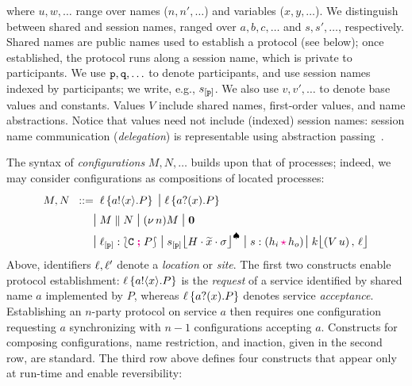 \documentclass[runningheads,plain]{llncs}
\begin{document}
\noindent 
where  
$u, w, \ldots$
range over 
names ($n, n', \ldots$) and variables ($x,y,\ldots$).
We distinguish between shared and session names, 
ranged over
$a,b,c,\ldots$ and $s,s',\ldots$, respectively.
Shared names are public names used to establish a protocol (see below); once established, the protocol runs along a session name, which is private to participants.
We   use $\mathtt{p}, \mathtt{q}, \ldots$ to denote  participants, and 
use session names indexed by participants;  we write, e.g., $s_{[\mathtt{p}]}$.
We also use $v,v',\ldots$ to denote
     base values and constants. 
Values $V$ include shared names, 
first-order values, and  {name abstractions}.
Notice that values need not include (indexed) session names: 
session name communication (\emph{delegation}) is  representable using abstraction passing~\cite{KPY2016}.

The syntax of \emph{configurations} $M, N, \ldots$ builds upon that of processes; indeed, we may consider configurations as compositions of located processes:
\begin{align*}
M,N		 \bnfis &
\myloc{\loc}{\bout{a}{x}{P}}
\sbnfbar 
\myloc{\loc}{\binp{a}{x}{P}}
\\
\sbnfbar &
M \Par N 
\sbnfbar 
\news{n} M
\sbnfbar 
\inact 
\\
 \sbnfbar &
{\np{\ep{\loc}{\p}}{\conf{\stack C}{P}}} %
\sbnfbar 
{\monig{\ep{s}{\p}}{H}{\mytilde{x}}{\store}}  %
 \sbnfbar 
\codah{s}{h_i}{h_o}%
\sbnfbar 
 {\mem{k}{(\appl{V}{u})}{\loc}} %
\end{align*}
Above,  identifiers $\ell, \ell'$ denote a  \emph{location} or  \emph{site}. 
The first two constructs enable protocol establishment:
$\ell\left\{a ! \langle x \rangle .{P}\right\}$ is the \emph{request} of a service identified by shared name $a$ implemented by
$P$, whereas $\ell\left\{a ? (x) .{P}\right\}$ denotes service \emph{acceptance}. 
Establishing an $n$-party protocol on service $a$ then requires one configuration requesting $a$ 
synchronizing with  $n-1$ configurations accepting $a$.
Constructs for  composing configurations, name restriction, and  inaction, given in the second row, are standard.
The third row above defines four constructs that appear only at run-time 
and   enable  reversibility:
\end{document}
